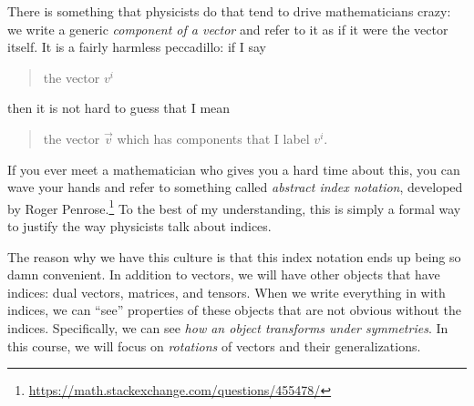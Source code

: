 There is something that physicists do that tend to drive mathematicians crazy: we write a generic \emph{component of a vector} and refer to it as if it were the vector itself. It is a fairly harmless peccadillo: if I say
\begin{quote}
the vector $v^i$
\end{quote}
then it is not hard to guess that I mean
\begin{quote}
the vector $\vec{v}$ which has components that I label $v^i$.
\end{quote}
If you ever meet a mathematician who gives you a hard time about this, you can wave your hands and refer to something called \emph{abstract index notation}, developed by Roger Penrose.\footnote{\url{https://math.stackexchange.com/questions/455478/}} To the best of my understanding, this is simply a formal way to justify the way physicists talk about indices. 

The reason why we have this culture is that this index notation ends up being so damn convenient. In addition to vectors, we will have other objects that have indices: dual vectors, matrices, and tensors. When we write everything in with indices, we can ``see'' properties of these objects that are not obvious without the indices. Specifically, we can see \emph{how an object transforms under symmetries}. In this course, we will focus on \emph{rotations} of vectors and their generalizations. 

